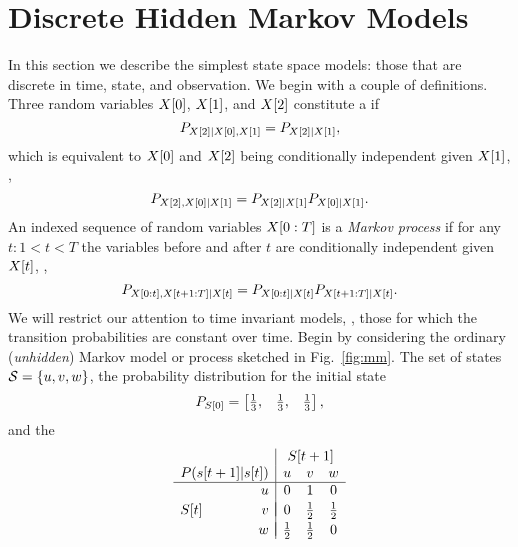 \section{Discrete Hidden Markov Models}
\label{sec:intro_hmm}
%

In this section we describe the simplest state space models: those
that are discrete in time, state, and observation.  We begin with a
couple of definitions.  Three random variables ${X}{[0]}$,
${X}{[1]}$, and ${X}{[2]}$ constitute a \emph{}
if
\begin{equation}
  \label{eq:MarkovChain}
  P_{{X}{[2]}\mid {X}{[0]},{X}{[1]}} = P_{{X}{[2]}\mid {X}{[1]}},
\end{equation}
which is equivalent to ${X}{[0]}$ and ${X}{[2]}$ being conditionally
independent given ${X}{[1]}$, \ie,
\begin{equation*}
  P_{{X}{[2]},{X}{[0]}\mid {X}{[1]}} = P_{{X}{[2]}\mid {X}{[1]}}   P_{{X}{[0]}\mid {X}{[1]}}.
\end{equation*}
An indexed sequence of random variables $X[0:T]$ is a
\emph{Markov process}  if
for any $t: 1 < t < T$ the variables before and after $t$ are
conditionally independent given ${X}{[t]}$, \ie,
\begin{equation}
  \label{eq:MarkovProcess}
  P_{X[0:t],X[t+1:T]\mid {X}{[t]}} =
  P_{X[0:t]\mid {X}{[t]}} P_{X[t+1:T]\mid {X}{[t]}}.
\end{equation}
We will restrict our attention to time invariant models, \ie, those
for which the transition probabilities are constant over time.
Begin by considering the ordinary (\emph{unhidden})
Markov model or process sketched in Fig.~\ref{fig:mm}.  The set of
states $\states = \left\{u,v,w\right\}$, the probability distribution
for the initial state
\begin{equation}
  \label{eq:InitialProbabilites}
P_{{S}{[0]}} =
\begin{bmatrix}
  \frac{1}{3}, & \frac{1}{3}, & \frac{1}{3}
\end{bmatrix},  
\end{equation}
and the  %
%
\begin{equation}
  \label{eq:TransitionMatrix}
\begin{array}{rr|ccc}
  && \multicolumn{3}{c}{\ti{S}{t+1}} \\
  \multicolumn{2}{c|}{P(\ti{s}{t+1}|\ti{s}{t})} & u & v & w \\ \hline
  & u & 0 & 1 & 0 \\  && \vspace{-1 em} \\
  \ti{S}{t} & v & 0 & \frac{1}{2} & \frac{1}{2} \\  && \vspace{-0.98 em} \\
  & w & \frac{1}{2} & \frac{1}{2} & 0
\end{array}
\end{equation}

